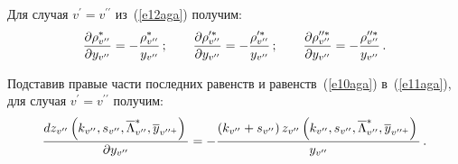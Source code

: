    Для случая $v^\prime=v^{\prime\prime}$ из~(\ref{e12aga}) получим:
   $$
   \displaystyle\frac{\displaystyle \partial \rho_{v^{\prime\prime}}^*\mathstrut}{\displaystyle \partial y_{v^{\prime\prime}}\mathstrut}=-
\displaystyle\frac{\displaystyle \rho^*_{v^{\prime\prime}}\mathstrut}{\displaystyle y_{v^{\prime\prime}}\mathstrut}\,;\qquad 
   \displaystyle\frac{\displaystyle \partial \rho_{v^{\prime\prime}}^{\prime *}\mathstrut}{\displaystyle \partial y_{v^{\prime\prime}}\mathstrut}=
   -\displaystyle\frac{\displaystyle \rho^{\prime *}_{v^{\prime\prime}}\mathstrut}{\displaystyle y_{v^{\prime\prime}}\mathstrut}\,;\qquad
   \displaystyle\frac{\displaystyle \partial \rho^{\prime\prime *}_{v^{\prime\prime}}\mathstrut}{\displaystyle \partial y_{v^{\prime\prime}}\mathstrut}=-
   \displaystyle\frac{\displaystyle \rho_{v^{\prime\prime}}^{\prime\prime *}\mathstrut}{\displaystyle y_{v^{\prime\prime}}\mathstrut}\,.
   $$
   
   Подставив правые части последних равенств и равенств~(\ref{e10aga}) 
в~(\ref{e11aga}), для случая $v^\prime=v^{\prime\prime}$ получим:
   \begin{equation}
   \displaystyle\frac{\displaystyle dz_{ v^{\prime\prime}}\left(k_{ v^{\prime\prime}}, s_{ v^{\prime\prime}}, 
\overline{\Lambda}^*_{ v^{\prime\prime}}, \overline{y}_{ v^{\prime\prime 
+}}\right)\mathstrut}{\displaystyle \partial y_{ v^{\prime\prime}}\mathstrut}=
-\displaystyle\frac{\displaystyle \left(k_{ v^{\prime\prime}}+s_{ 
v^{\prime\prime}}\right)z_{ v^{\prime\prime}}\left(k_{ v^{\prime\prime}}, 
s_{v^{\prime\prime}}, \overline{\Lambda}^*_{ v^{\prime\prime}}, \overline{y}_{ 
v^{\prime\prime +}}\right)\mathstrut}{\displaystyle y_{ v^{\prime\prime}}\mathstrut}\,.
   \label{e14aga}
   \end{equation}
   
